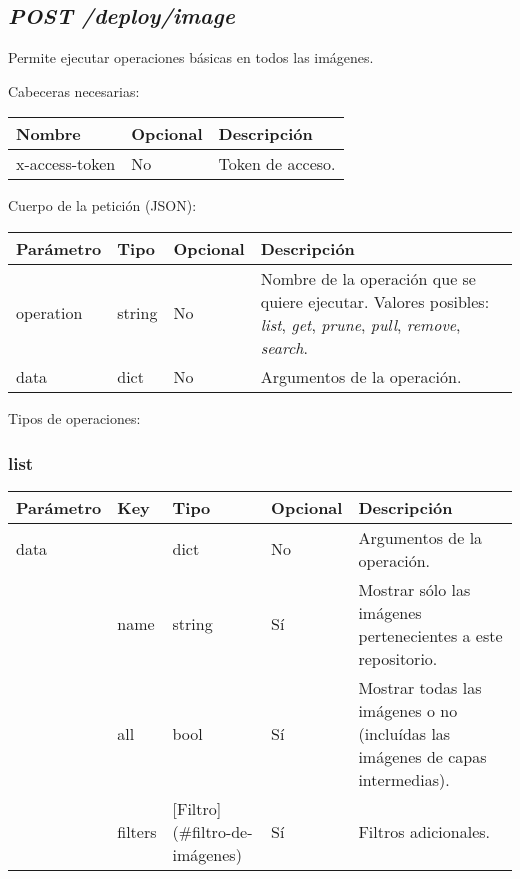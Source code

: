 	
	
	
	
	\subsection{\textit{POST /deploy/image}}
		Permite ejecutar operaciones básicas en todos las imágenes.
	
		Cabeceras necesarias:
		\begin{table}[h!]
			\centering
	\begin{adjustbox}{max width=\textwidth}
			\begin{tabular}{|l|l|l|}
				\hline
				Nombre & Opcional & Descripción \\ \hline
				x-access-token & No & Token de acceso. \\ \hline
			\end{tabular}
\end{adjustbox}
		\end{table}
		
		Cuerpo de la petición (JSON):
		
		\begin{table}[!h]
			\centering
	\begin{adjustbox}{max width=\textwidth}
			\begin{tabular}{|l|l|l|l|}
				\hline
				Parámetro & Tipo & Opcional & Descripción \\ \hline
				operation & string & No & Nombre de la operación que se quiere ejecutar. Valores posibles: \textit{list}, \textit{get}, \textit{prune}, \textit{pull}, \textit{remove}, \textit{search}. \\ \hline
				data & dict & No & Argumentos de la operación. \\ \hline
			\end{tabular}
\end{adjustbox}
		\end{table}
	
		Tipos de operaciones:
		
			\subsubsection{list}
				\begin{table}[!h]
					\centering
	\begin{adjustbox}{max width=\textwidth}
					\begin{tabular}{|l|l|l|l|l|}
						\hline
						Parámetro & Key & Tipo & Opcional & Descripción \\ \hline
						data &  & dict & No & Argumentos de la operación. \\ \hline
						& name & string & Sí & Mostrar sólo las imágenes pertenecientes a este repositorio. \\ \hline
						& all & bool & Sí & Mostrar todas las imágenes o no (incluídas las imágenes de capas intermedias). \\ \hline
						& filters & [Filtro](\#filtro-de-imágenes) & Sí & Filtros adicionales. \\ \hline
					\end{tabular}
\end{adjustbox}
				\end{table}
			
